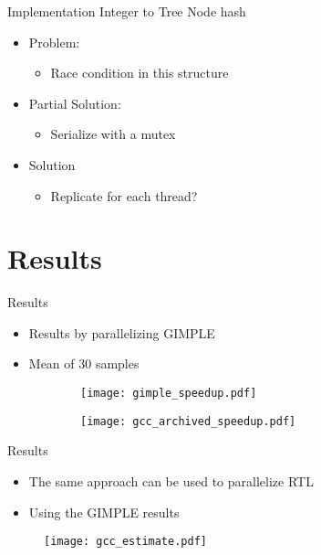 \begin{frame}{Implementation}
    Integer to Tree Node hash

    \begin{itemize}
        \item Problem:
            \begin{itemize}
                \item Race condition in this structure
            \end{itemize}
        \item Partial Solution:
            \begin{itemize}
                \item Serialize with a mutex
            \end{itemize}
        \item Solution 
            \begin{itemize}
                \item Replicate for each thread?
            \end{itemize}
    \end{itemize}
\end{frame}


\section{Results}

\begin{frame}{Results}
    \begin{itemize}
        \item Results by parallelizing GIMPLE
        \item Mean of 30 samples
    \end{itemize}

\begin{figure}[ht]
\centering
  \begin{subfigure}[b]{0.49\textwidth}
 	\texttt{[image: gimple\_speedup.pdf]}
  \end{subfigure}
  \begin{subfigure}[b]{0.49\textwidth}
 	\texttt{[image: gcc\_archived\_speedup.pdf]}
  \end{subfigure}
\end{figure}
\end{frame}

\begin{frame}{Results}
    \begin{itemize}
        \item The same approach can be used to parallelize RTL
        \item Using the GIMPLE results
    \end{itemize}

\begin{figure}[ht]
\centering
 	\texttt{[image: gcc\_estimate.pdf]}
\end{figure}
\end{frame}

